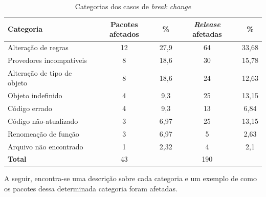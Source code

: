 \begin{table}[]
\begin{tabular}{|l|c|c|c|c|}
\hline
\centering
\textbf{Categoria}           & \textbf{Pacotes afetados} & \textbf{\%}   & \textbf{\textit{Release} afetadas} & \textbf{\%}    \\ \hline
Alteração de regras          & 12              & 27,9 & 64                          & 33,68 \\
Provedores incompatíveis     & 8               & 18,6 & 30                          & 15,78 \\
Alteração de tipo de objeto  & 8               & 18,6 & 24                          & 12,63 \\
Objeto indefinido            & 4               & 9,3  & 25                          & 13,15 \\
Código errado                & 4               & 9,3  & 13                          & 6,84  \\
Código não-atualizado        & 3               & 6,97 & 25                          & 13,15  \\
Renomeação de função         & 3               & 6,97 & 5                           & 2,63  \\
Arquivo não encontrado       & 1               & 2,32 & 4                           & 2,1  \\ \hline
\textbf{Total}               & 43              &      & 190                         &       \\ \hline
\end{tabular}
\caption{Categorias dos casos de \textit{break change}}
\label{tab:bc_category}
\end{table}

A seguir, encontra-se uma descrição sobre cada categoria e um exemplo de como os pacotes dessa determinada categoria foram afetadas.


